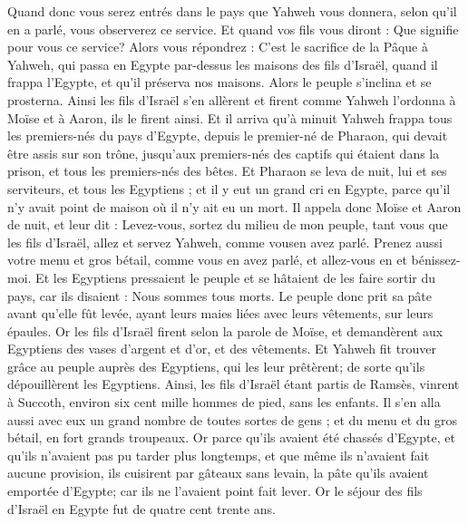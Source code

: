 \begin{multicols}{2}
Quand donc vous serez entrés dans le pays que Yahweh vous donnera, selon qu'il en a parlé, vous observerez ce service.
Et quand vos fils vous diront : Que signifie pour vous ce service?
Alors vous répondrez : C'est le sacrifice de la Pâque à Yahweh, qui passa en Egypte par-dessus les maisons des fils d'Israël, quand il frappa l'Egypte, et qu'il préserva nos maisons. Alors le peuple s'inclina et se prosterna.
Ainsi les fils d'Israël s'en allèrent et firent comme Yahweh l’ordonna à Moïse et à Aaron, ils le firent ainsi.
Et il arriva qu'à minuit Yahweh frappa tous les premiers-nés du pays d'Egypte, depuis le premier-né de Pharaon, qui devait être assis sur son trône, jusqu'aux premiers-nés des captifs qui étaient dans la prison, et tous les premiers-nés des bêtes.
Et Pharaon se leva de nuit, lui et ses serviteurs, et tous les Egyptiens ; et il y eut un grand cri en Egypte, parce qu'il n'y avait point de maison où il n'y ait eu un mort.
Il appela donc Moïse et Aaron de nuit, et leur dit : Levez-vous, sortez du milieu de mon peuple, tant vous que les fils d'Israël, allez et servez Yahweh, comme vousen avez parlé.
Prenez aussi votre menu et gros bétail, comme vous en avez parlé, et allez-vous en et bénissez-moi.
Et les Egyptiens pressaient le peuple et se hâtaient de les faire sortir du pays, car ils disaient : Nous sommes tous morts.
Le peuple donc prit sa pâte avant qu'elle fût levée, ayant leurs maies liées avec leurs vêtements, sur leurs épaules.
Or les fils d'Israël firent selon la parole de Moïse, et demandèrent aux Egyptiens des vases d'argent et d'or, et des vêtements.
Et Yahweh fit trouver grâce au peuple auprès des Egyptiens, qui les leur prêtèrent; de sorte qu'ils dépouillèrent les Egyptiens.
Ainsi, les fils d'Israël étant partis de Ramsès, vinrent à Succoth, environ six cent mille hommes de pied, sans les enfants.
Il s'en alla aussi avec eux un grand nombre de toutes sortes de gens ; et du menu et du gros bétail, en fort grands troupeaux.
 Or parce qu'ils avaient été chassés d'Egypte, et qu'ils n'avaient pas pu tarder plus longtemps, et que même ils n'avaient fait aucune provision, ils  cuisirent par gâteaux sans levain, la pâte qu’ils avaient emportée d’Egypte; car ils ne l'avaient point fait lever. 
Or le séjour des fils d'Israël en Egypte fut de quatre cent trente ans.

\end{multicols}
